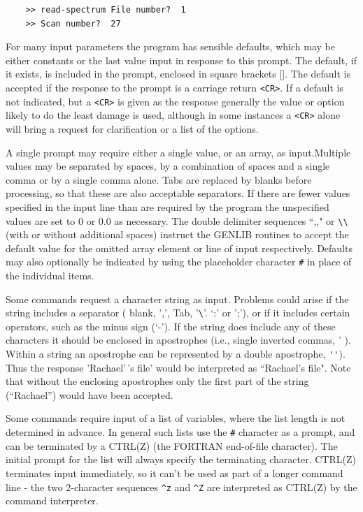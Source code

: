 \documentclass[11pt,twoside]{report}
\begin{document}
\begin{verbatim}
    >> read-spectrum File number?  1 
    >> Scan number?  27
\end{verbatim}

For many input parameters the program has sensible
defaults, which may be either constants or the last
value input in response to this prompt. The default, if it exists, is
included in the prompt, enclosed in square brackets []. The default is
accepted if the response to the prompt is a carriage return
\verb+<CR>+. If a default is not indicated, but a \verb+<CR>+ is given
as the response generally the value or option likely to do the least
damage is used, although in some instances a \verb+<CR>+ alone will
bring a request for clarification or a list of the options.

A single prompt may require either a single value, or an array, as
input.Multiple values may be separated by spaces, by
a combination of spaces and a single comma or by a single comma
alone. Tabs are replaced by blanks before processing, so
that these are also acceptable separators. If there are fewer values
specified in the input line than are required by the program the
unspecified values are set to 0 or 0.0
as necessary. The double delimiter sequences
``,," or \verb+\\+ (with or without additional spaces) instruct the
GENLIB routines to accept the default value for the
omitted array element or line of input respectively. Defaults may also
optionally be indicated by using the placeholder character
\verb+#+ in place of the individual items. 

Some commands request a character string as
input.  Problems could arise if the string includes a separator (
blank, ',', Tab, '\verb+\+'. `:' or ';'), or if it includes certain
operators, such as the minus sign (`-'). If the string does include
any of these characters it should be enclosed in apostrophes (i.e.,
single inverted commas, ' ). Within a string an apostrophe can be
represented by a double apostrophe,
\verb+''+). Thus the response 'Rachael'\,'s file' would be interpreted
as ``Rachael's file". Note that without the enclosing apostrophes only
the first part of the string (``Rachael'') would have been accepted.

Some commands require input of a list of
variables, where the list length is not determined in advance. In
general such lists use the
\verb+#+ character as a prompt, and can be 
terminated by a CTRL(Z) (the FORTRAN end-of-file
character). The initial prompt for the list will always specify the
terminating character. CTRL(Z) terminates input immediately, so it
can't be used as part of a longer command line - the two 2-character
sequences \verb+^z+ and \verb+^Z+ are interpreted as CTRL(Z) by the
command interpreter.
\end{document}

